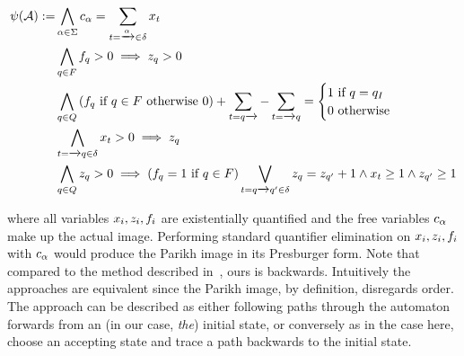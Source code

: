 \documentclass[acmsmall,review,anonymous]{acmart}\settopmatter{printfolios=true,printccs=false,printacmref=true}
\theoremstyle{definition}
\newif\ifoutline
\newcommand{\contents}[1]{\ifoutline{\color{blue}
    \begin{itemize}
    #1
    \end{itemize}
  }\fi}
\begin{document}
\begin{equation}
\begin{aligned}
\ParikhMap(\Automaton) := 
& \AndComp{\Letter \in \Alphabet}{\LetterVar_{\Letter} = \sum_{\Transition = \FromLabelTo{}{\Letter}{} \in \Transitions} \TransitionVar_{\Transition}
}\\
& \AndComp{\State \in \AcceptingStates}{\FinalStateVar_{\State} > 0 \implies \StateVar_{\State} > 0}\\
& \AndComp{\State \in \States}{
  \left(\FinalStateVar_{\State} \text{ if } \State \in \AcceptingStates \text{ otherwise } 0 \right) +
  \sum_{\Transition = \FromLabelTo{\State}{}{}} - \sum_{\Transition = \FromLabelTo{}{}{\State}}
= \begin{cases}
    1 \text{  if $\State = \InitialState$} \\
    0 \text{ otherwise}
  \end{cases}
}\\
& \AndComp{\Transition = \FromLabelTo{}{}{\State} \in \Transitions}{
  \TransitionVar_{\Transition} > 0 \implies \StateVar_{\State}
} \\
& \AndComp{\State \in \States}{
  \StateVar_{\State} > 0 \implies
  \left(\FinalStateVar_{\State} = 1 \text{ if } \State \in \AcceptingStates\right) \OrComp{\Transition = \FromLabelTo{\State}{}{\State'} \in \Transitions}{
    \StateVar_{\State} = \StateVar_{\State'} + 1 \land 
    \TransitionVar_{\Transition} \geq 1 \land
  \StateVar_{\State'} \geq 1
    }
}
\end{aligned}
\label{eq:generate-parikh}
\end{equation}

where all variables $x_i, z_i, f_i$ are
existentially quantified and the free variables $c_\alpha$ make up the
actual image. Performing standard quantifier elimination on $x_i,
z_i, f_i$ with $c_\alpha$ would produce the
Parikh image in its Presburger form. Note that compared to the method described
in~\cite{generate-parikh-image}, ours is backwards. Intuitively the approaches
are equivalent since the Parikh image, by definition, disregards order. The
approach can be described as either following paths through the automaton
forwards from an (in our case, \emph{the}) initial state, or conversely as in
the case here, choose an accepting state and trace a path backwards to the
initial state. 

\contents{
  \item mention the bug here!
}
\end{document}
